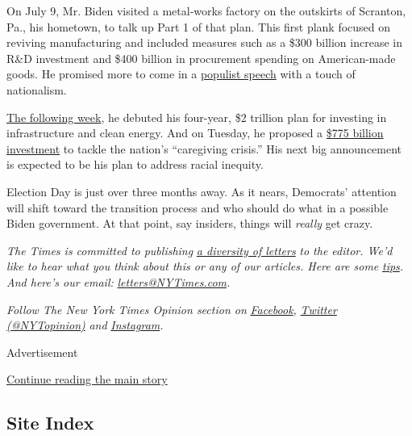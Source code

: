 On July 9, Mr. Biden visited a metal-works factory on the outskirts of
Scranton, Pa., his hometown, to talk up Part 1 of that plan. This first
plank focused on reviving manufacturing and included measures such as a
\$300 billion increase in R\&D investment and \$400 billion in
procurement spending on American-made goods. He promised more to come in
a
\href{https://www.nytimes3xbfgragh.onion/2020/07/09/us/politics/biden-buy-american.html}{populist
speech} with a touch of nationalism.

\href{https://www.nytimes3xbfgragh.onion/2020/07/14/us/politics/biden-climate-plan.html}{The
following week}, he debuted his four-year, \$2 trillion plan for
investing in infrastructure and clean energy. And on Tuesday, he
proposed a
\href{https://www.nytimes3xbfgragh.onion/2020/07/21/us/politics/biden-workplace-childcare.html}{\$775
billion investment} to tackle the nation's ``caregiving crisis.'' His
next big announcement is expected to be his plan to address racial
inequity.

Election Day is just over three months away. As it nears, Democrats'
attention will shift toward the transition process and who should do
what in a possible Biden government. At that point, say insiders, things
will \emph{really} get crazy.

\emph{The Times is committed to publishing}
\href{https://www.nytimes3xbfgragh.onion/2019/01/31/opinion/letters/letters-to-editor-new-york-times-women.html}{\emph{a
diversity of letters}} \emph{to the editor. We'd like to hear what you
think about this or any of our articles. Here are some}
\href{https://help.nytimes3xbfgragh.onion/hc/en-us/articles/115014925288-How-to-submit-a-letter-to-the-editor}{\emph{tips}}\emph{.
And here's our email:}
\href{mailto:letters@NYTimes.com}{\emph{letters@NYTimes.com}}\emph{.}

\emph{Follow The New York Times Opinion section on}
\href{https://www.facebookcorewwwi.onion/nytopinion}{\emph{Facebook}}\emph{,}
\href{http://twitter.com/NYTOpinion}{\emph{Twitter (@NYTopinion)}}
\emph{and}
\href{https://www.instagram.com/nytopinion/}{\emph{Instagram}}\emph{.}

Advertisement

\protect\hyperlink{after-bottom}{Continue reading the main story}

\hypertarget{site-index}{%
\subsection{Site Index}\label{site-index}}

